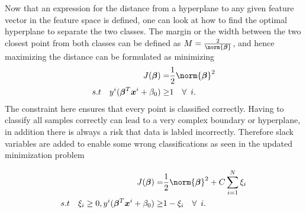             Now that an expression for the distance from a hyperplane to any given feature vector in the feature space is defined, one can look at how to find the optimal hyperplane to separate the two classes. The margin or the width between the two closest point from both classes can be defined as $M = \frac{2}{\norm{\bm \beta}}$, and hence maximizing the distance can be formulated as minimizing
            \begin{align}
                J(\bm \beta) = & \frac{1}{2}\norm{\bm \beta}^2 \nonumber \\
                 s.t \quad y^i(\bm \beta^T\bm x^i + \beta_0) \geq & 1 \quad \forall \enspace i.
                \label{svm:cost}
            \end{align}
            The constraint here ensures that every point is classified correctly. Having to classify all samples correctly can lead to a very complex boundary or hyperplane, in addition there is always a risk that data is labled incorrectly. Therefore slack variables are added to enable some wrong classifications as seen in the updated minimization problem
            
            \begin{align}
                J(\bm \beta) = & \frac{1}{2}\norm{\bm \beta}^2  + C \sum_{i=1}^N \xi_i \nonumber \\
                 s.t \quad \xi_i \geq 0, y^i(\bm \beta^T\bm x^i + \beta_0) \geq & 1 - \xi_i \quad \forall \enspace i.
                \label{svm:cost}
            \end{align}
            
